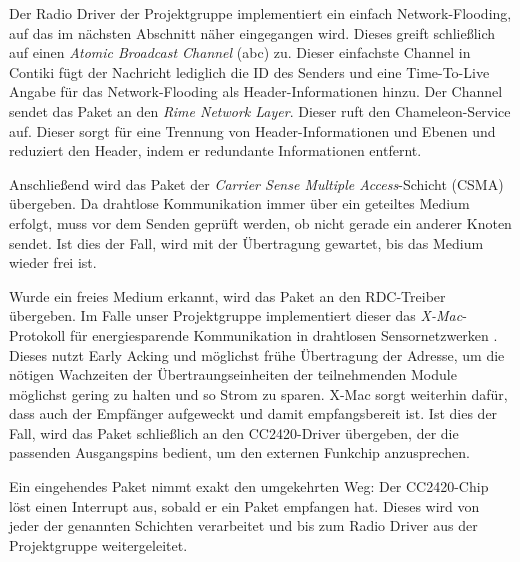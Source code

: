 Der Radio Driver der Projektgruppe implementiert ein einfach Network-Flooding, auf das im nächsten Abschnitt näher eingegangen wird. Dieses greift schließlich auf einen \textit{Atomic Broadcast Channel} (abc) zu. Dieser einfachste Channel in Contiki fügt der Nachricht lediglich die ID des Senders und eine Time-To-Live Angabe für das Network-Flooding als Header-Informationen hinzu. Der Channel sendet das Paket an den \textit{Rime Network Layer}. Dieser ruft den Chameleon-Service auf. Dieser sorgt für eine Trennung von Header-Informationen und Ebenen und reduziert den Header, indem er redundante Informationen entfernt. 

Anschließend wird das Paket der \textit{Carrier Sense Multiple Access}-Schicht (CSMA) übergeben. Da drahtlose Kommunikation immer über ein geteiltes Medium erfolgt, muss vor dem Senden geprüft werden, ob nicht gerade ein anderer Knoten sendet. Ist dies der Fall, wird mit der Übertragung gewartet, bis das Medium wieder frei ist.

Wurde ein freies Medium erkannt, wird das Paket an den RDC-Treiber übergeben. Im Falle unser Projektgruppe implementiert dieser das \textit{X-Mac}-Protokoll für energiesparende Kommunikation in drahtlosen Sensornetzwerken \cite{Buettner:2006:Proc}. Dieses nutzt Early Acking und möglichst frühe Übertragung der Adresse, um die nötigen Wachzeiten der Übertraungseinheiten der teilnehmenden Module möglichst gering zu halten und so Strom zu sparen. X-Mac sorgt weiterhin dafür, dass auch der Empfänger aufgeweckt und damit empfangsbereit ist. Ist dies der Fall, wird das Paket schließlich an den CC2420-Driver übergeben, der die passenden Ausgangspins bedient, um den externen Funkchip anzusprechen.

Ein eingehendes Paket nimmt exakt den umgekehrten Weg: Der CC2420-Chip löst einen Interrupt aus, sobald er ein Paket empfangen hat. Dieses wird von jeder der genannten Schichten verarbeitet und bis zum Radio Driver aus der Projektgruppe weitergeleitet.
\label{sec:rime}



